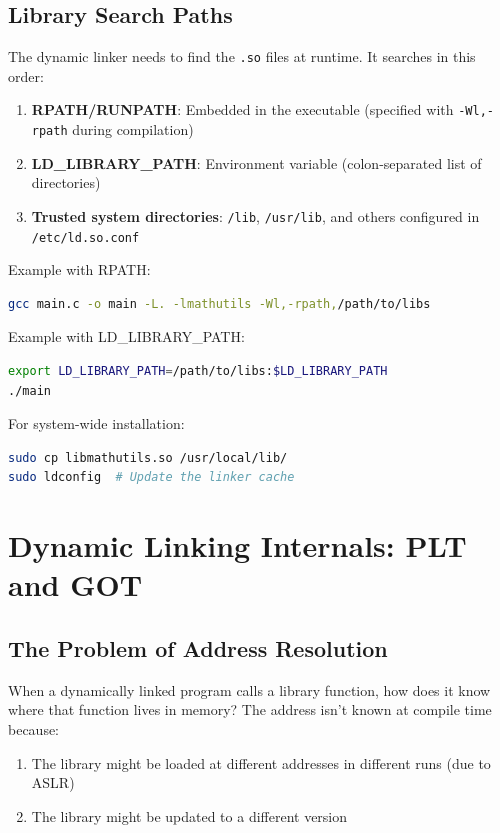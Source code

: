 \subsection{Library Search Paths}

The dynamic linker needs to find the \texttt{.so} files at runtime. It searches in this order:

\begin{enumerate}
    \item \textbf{RPATH/RUNPATH}: Embedded in the executable (specified with \texttt{-Wl,-rpath} during compilation)
    \item \textbf{LD\_LIBRARY\_PATH}: Environment variable (colon-separated list of directories)
    \item \textbf{Trusted system directories}: \texttt{/lib}, \texttt{/usr/lib}, and others configured in \texttt{/etc/ld.so.conf}
\end{enumerate}

Example with RPATH:
\begin{lstlisting}[language=bash]
gcc main.c -o main -L. -lmathutils -Wl,-rpath,/path/to/libs
\end{lstlisting}

Example with LD\_LIBRARY\_PATH:
\begin{lstlisting}[language=bash]
export LD_LIBRARY_PATH=/path/to/libs:$LD_LIBRARY_PATH
./main
\end{lstlisting}

For system-wide installation:
\begin{lstlisting}[language=bash]
sudo cp libmathutils.so /usr/local/lib/
sudo ldconfig  # Update the linker cache
\end{lstlisting}

\section{Dynamic Linking Internals: PLT and GOT}
\label{sec:plt-got}

\subsection{The Problem of Address Resolution}

When a dynamically linked program calls a library function, how does it know where that function lives in memory? The address isn't known at compile time because:
\begin{enumerate}
    \item The library might be loaded at different addresses in different runs (due to ASLR)
    \item The library might be updated to a different version
\end{enumerate}

